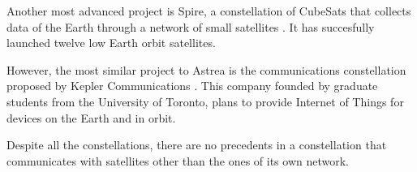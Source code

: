 Another most advanced project is Spire, a constellation of CubeSats that collects data of the Earth through a network of small satellites \cite{spire}. It has succesfully launched twelve low Earth orbit satellites.

However, the most similar project to Astrea is the communications constellation proposed by Kepler Communications \cite{keppler}. This company founded by graduate students from the University of Toronto, plans to provide Internet of Things for devices on the Earth and in orbit.

Despite all the constellations, there are no precedents in a constellation that communicates with satellites other than the ones of its own network.
